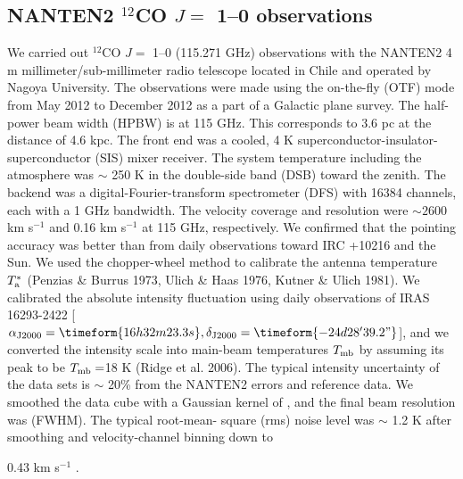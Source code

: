 \documentclass[onecolumn]{pasj01}
\begin{document}
{\subsection{NANTEN2 $^{12}$CO $J=$ 1--0 observations}
We carried out $^{12}$CO $J=$ 1--0 (115.271 GHz) observations with the NANTEN2 4 m millimeter/sub-millimeter radio telescope located in Chile {and} operated by Nagoya University. The observations were made {using} the on-the-fly (OTF) mode from May 2012 to December 2012 as a part of {a} Galactic plane survey. 
The half-power beam width (HPBW) is  at 115 GHz. This corresponds to 3.6 pc at the distance of 4.6 kpc. 
The front end was a cooled{, 4 K} superconductor-insulator-superconductor (SIS) mixer receiver. 
The system temperature including the atmosphere was $\sim$ 250 K in the double-side band (DSB) toward the zenith. 
The backend was a digital-Fourier-transform spectrometer (DFS) with 16384 channels{, each with a} 1 GHz bandwidth. The velocity coverage and resolution were $\sim 2600$ km s$^{-1}$ and 0.16 km s$^{-1}$ at 115 GHz, respectively. {We confirmed that} the pointing accuracy was better than  {from} daily observations toward IRC +10216 and the Sun. 
We used the chopper-wheel method to calibrate the antenna temperature $T_{\rm a}^*$ (Penzias \& Burrus 1973, Ulich \& Haas 1976, Kutner \& Ulich 1981). 
{We calibrated} the absolute intensity fluctuation {using} daily observations of IRAS 16293-2422 [$\alpha_{\rm J2000} = \timeform{16h32m23.3s} , \delta_{\rm J2000} = \timeform{-24d28'39. 2"}$], and {we converted} the intensity scale into {main-beam temperatures} $T_{\rm mb}$ by assuming its peak to be $T_{\rm mb} = $18 K (Ridge et al. 2006). {The {typical intensity uncertainty of the data sets is $\sim$ 20\%} from the NANTEN2 errors and reference data.}
{We smoothed} the data cube with a Gaussian kernel of , and the final beam {resolution} {was}  (FWHM).
The typical root-mean- square (rms) noise level {was} $\sim$ 1.2 K {after} smoothing and velocity-channel binning down to} 0.43 km s$^{-1}$ .
  
\end{document}
